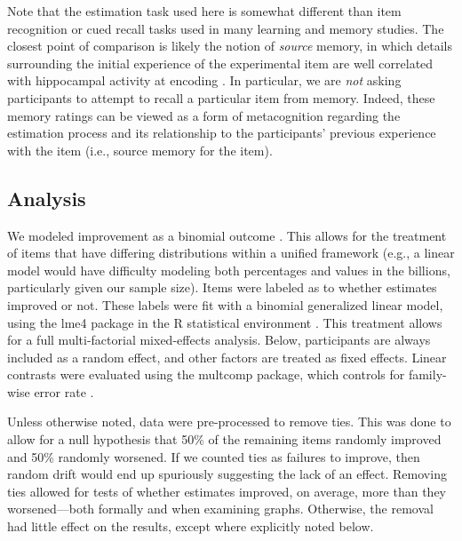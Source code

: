 Note that the estimation task used here is somewhat different than item
recognition or cued recall tasks used in many learning and memory studies. The
closest point of comparison is likely the notion of \emph{source} memory, in
which details surrounding the initial experience of the experimental item are
well correlated with hippocampal activity at encoding
\parencite{davachi_multiple_2003}. In particular, we are \emph{not} asking
participants to attempt to recall a particular item from memory. Indeed, these
memory ratings can be viewed as a form of metacognition regarding the estimation
process and its relationship to the participants' previous experience with the
item (i.e., source memory for the item).

\subsection{Analysis}

We modeled improvement as a binomial outcome \parencite[as
did][]{munnich_longevities_2005}. This allows for the treatment of items that have
differing distributions within a unified framework (e.g., a linear model would
have difficulty modeling both percentages and values in the billions,
particularly given our sample size).  Items were labeled as to whether estimates
improved or not. These labels were fit with a binomial generalized linear model,
using the lme4 package in the R statistical environment
\parencite{r_development_core_team_r:_2009_fixed}. This treatment allows for a full
multi-factorial mixed-effects analysis. Below, participants are always included
as a random effect, and other factors are treated as fixed effects. Linear
contrasts were evaluated using the multcomp package, which controls for
family-wise error rate \parencite{hothorn_simultaneous_2008}.

Unless otherwise noted, data were pre-processed to remove ties. This was done to
allow for a null hypothesis that 50\% of the remaining items randomly improved
and 50\% randomly worsened. If we counted ties as failures to improve, then
random drift would end up spuriously suggesting the lack of an effect. Removing
ties allowed for tests of whether estimates improved, on average, more than they
worsened––both formally and when examining graphs. Otherwise, the removal had
little effect on the results, except where explicitly noted below.


